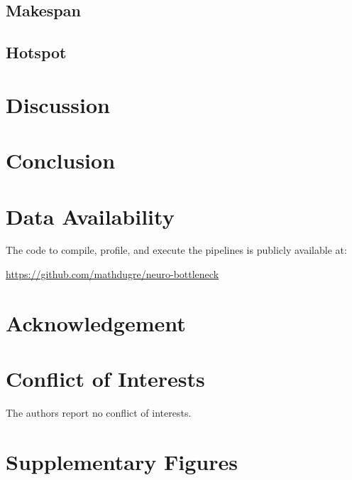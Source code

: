 \documentclass[conference]{IEEEtran}
\begin{document}
\subsection{Makespan}


\subsection{Hotspot}
% 


\section{Discussion}



\section{Conclusion}

\section{Data Availability}
\label{data-availability}
The code to compile, profile, and execute the pipelines is publicly available at:

\href{https://github.com/mathdugre/neuro-bottleneck}{https://github.com/mathdugre/neuro-bottleneck}

\section*{Acknowledgement}

\section*{Conflict of Interests}
The authors report no conflict of interests.

\section*{Supplementary Figures}


% 

\end{document}
